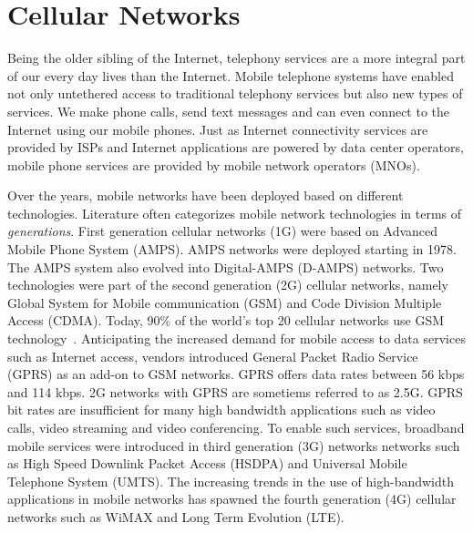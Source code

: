 \section{Cellular Networks} %
Being the older sibling of the Internet, telephony services are a more integral part of our every day lives than the Internet. Mobile telephone systems have enabled not only untethered access to traditional telephony services but also new types of services. We make phone calls, send text messages and can even connect to the Internet using our mobile phones. Just as Internet connectivity services are provided by ISPs and Internet applications are powered by data center operators, mobile phone services are provided by mobile network operators (MNOs).  

Over the years, mobile networks have been deployed based on different technologies. Literature often categorizes mobile network technologies in terms of \textit{generations}. First generation cellular networks (1G) were based on Advanced Mobile Phone System (AMPS). AMPS networks were deployed starting in 1978. The AMPS system also evolved into Digital-AMPS (D-AMPS) networks. Two technologies were part of the second generation (2G) cellular networks, namely Global System for Mobile communication (GSM) and Code Division Multiple Access (CDMA). Today, 90\% of the world's top 20 cellular networks use GSM technology~\cite{wiki:mobileoperators}. Anticipating the increased demand for mobile access to data services such as Internet access, vendors introduced General Packet Radio Service (GPRS) as an add-on to GSM networks. GPRS offers data rates between 56 kbps and 114 kbps. 2G networks with GPRS are sometiems referred to as 2.5G. GPRS bit rates are insufficient for many high bandwidth applications such as video calls, video streaming and video conferencing. To enable such services, broadband mobile services were introduced in third generation (3G) networks networks such as High Speed Downlink Packet Access (HSDPA) and Universal Mobile Telephone System (UMTS). The increasing trends in the use of high-bandwidth applications in mobile networks has spawned the fourth generation (4G) cellular networks such as WiMAX and Long Term Evolution (LTE).

